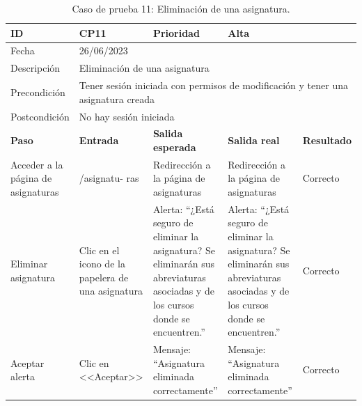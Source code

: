 \begin{table}[H]
\begin{tabular}{p{} p{} p{} p{} p{}}
\cellcolor{gray!25}
ID   & CP11 & \cellcolor{gray!25} Prioridad   & Alta \\ \hline
\cellcolor{gray!25} Fecha	&	\multicolumn{4}{l}{26/06/2023} \\ \hline
\cellcolor{gray!25} Descripción		&	\multicolumn{4}{l}{Eliminación de una asignatura} \\ \hline                                            
\cellcolor{gray!25}
Precondición  & \multicolumn{4}{p{.66\textwidth}}{Tener sesión iniciada con permisos de modificación y tener una asignatura creada} \\ \hline
\cellcolor{gray!25} Postcondición & \multicolumn{4}{l}{No hay sesión iniciada}                                                    \\ \hline
\rowcolor{gray!25}
\textbf{Paso}   & \textbf{Entrada} & \textbf{Salida esperada} & \textbf{Salida real} & \textbf{Resultado} \\ \hline
Acceder a la página de asignaturas 
& /asignatu-
ras                                                                           
& Redirección a la página de asignaturas                                   
& Redirección a la página de asignaturas                                   
& Correcto                            
\\ \hline
Eliminar asignatura
& Clic en el icono de la papelera de una asignatura
& Alerta: ``¿Está seguro de eliminar la asignatura? Se eliminarán sus abreviaturas asociadas y de los cursos donde se encuentren.''
& Alerta: ``¿Está seguro de eliminar la asignatura? Se eliminarán sus abreviaturas asociadas y de los cursos donde se encuentren.''
& Correcto
\\ \hline
Aceptar alerta
& Clic en <<Aceptar>>
& Mensaje: ``Asignatura eliminada correctamente''                             
& Mensaje: ``Asignatura eliminada correctamente''  
& Correcto                            
\\ \hline              
\end{tabular}
\caption{Caso de prueba 11: Eliminación de una asignatura.}
\end{table}

